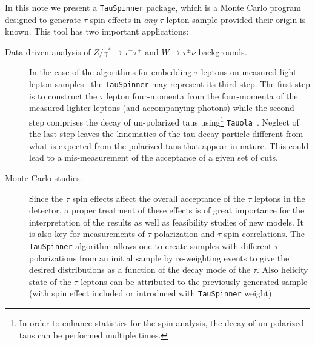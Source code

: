 \documentclass[12pt]{article}
\def\Wtaunu{\ensuremath{W\to\tau^{\pm}\nu}\xspace}
\def\Ztautau{\ensuremath{Z/\gamma^{*}\to\tau^{-}\tau^{+}}\xspace}
\def\Tau{\ensuremath{\tau}\xspace}
\begin{document}
In this note we present a {\tt TauSpinner} package, which is a Monte Carlo 
program designed to generate \Tau spin effects in {\it any} \Tau lepton sample
provided their origin is known. This tool has two important applications:
\begin{description}
\item[Data driven analysis of \Ztautau and \Wtaunu backgrounds.] 
In the case of the algorithms for embedding \Tau leptons on measured light lepton samples~\cite{EMBEDDED} 
the {\tt TauSpinner} may represent its third step. The first step is to construct the \Tau lepton four-momenta
from the four-momenta of the measured lighter leptons (and accompanying photons) while the second step
comprises the decay of un-polarized taus using\footnote{In order to enhance statistics for the spin analysis, the decay of un-polarized taus
can be performed multiple times.} {\tt Tauola}~\cite{TAUOLA1,TAUOLA2,TAUOLA3}. 
Neglect of the last step leaves the kinematics of the tau decay particle different from
what is expected from the polarized taus that appear in nature. 
This could lead to a mis-measurement of the acceptance of a given set of cuts.
\item[Monte Carlo studies.] 
Since the \Tau spin effects affect the overall acceptance of the \Tau leptons 
in the detector, a proper treatment of these effects
is of great importance for the interpretation of the results as well as feasibility studies of new
models.
It is also key for measurements of \Tau polarization and \Tau spin correlations. 
The {\tt TauSpinner} algorithm allows one to create samples with different
\Tau polarizations from an initial sample by re-weighting events to give the desired distributions as a function of the decay mode of the \Tau.
Also helicity state of the $\tau$ leptons can be attributed to the previously 
generated sample (with spin effect included or introduced with {\tt TauSpinner}
weight).
\end{description}
\end{document}
